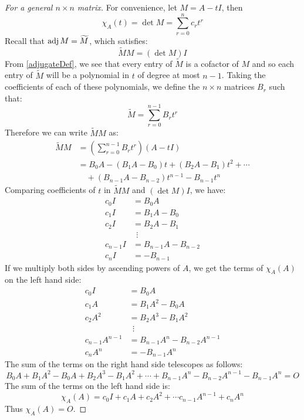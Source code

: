 \documentclass[../main.tex]{subfiles}
\begin{document}
\begin{proof}[For a general $n \times n$ matrix]
  \nonexaminable
  For convenience, let $M = A - tI$, then
  \[
    \chi_A(t) = \det M = \sum_{r = 0}^{n} c_r t^{r}
  \]
  Recall that $\operatorname{adj} M =\widetilde{M}$, which satisfies:
  \[
    \widetilde{M}M = (\det M)I
  \]
  From \cref{adjugateDef}, we see that every entry of $\widetilde{M}$ is a cofactor of $M$ and so each entry of $\widetilde{M}$ will be a polynomial in $t$ of degree at most $n - 1$.
  Taking the coefficients of each of these polynomials, we define the $n \times n$ matrices $B_r$ such that:
  \[
    \widetilde{M} = \sum_{r = 0}^{n - 1}  B_r t^{r}
  \]
  Therefore we can write $\widetilde{M} M$ as:
  \begin{align*}
    \widetilde{M} M &= \left(\sum_{r = 0}^{n - 1} B_r t^{r}\right)(A - tI) \\
                    &= B_0 A - (B_1 A - B_0)t + (B_2 A - B_1)t^2 + \cdots \\
                    &\quad + (B_{n - 1}A - B_{n- 2})t^{n - 1} - B_{n - 1}t^{n}
  \end{align*}
  Comparing coefficients of $t$ in $\widetilde{M} M$ and $(\det M)I$, we have:
  \begin{align*}
    c_0 I &= B_0 A \\
    c_1 I &= B_1 A - B_0 \\
    c_2 I &= B_2 A - B_1 \\
          &\ \ \vdots \\
    c_{n-1}I &= B_{n - 1}A - B_{n - 2} \\
    c_n I &= -B_{n - 1}
  \end{align*}
  If we multiply both sides by ascending powers of $A$, we get the terms of $\chi_A(A)$ on the left hand side:
  \begin{align*}
    c_0 I &= B_0 A \\
    c_1 A &= B_1 A^2 - B_0A \\
    c_2 A^2 &= B_2 A^3 - B_1A^2 \\
          &\ \ \vdots \\
    c_{n-1}A^{n - 1} &= B_{n - 1}A^{n} - B_{n - 2}A^{n - 1} \\
    c_n A^{n} &= -B_{n - 1}A^{n}
  \end{align*}
  The sum of the terms on the right hand side telescopes as follows:
  \[
    B_0A+B_1A^2 - B_0A + B_2 A^3 - B_1A^2 + \cdots + B_{n-1}A^{n} - B_{n-2}A^{n-1} -B_{n-1}A^{n} =O
  \]
  The sum of the terms on the left hand side is:
  \[
    \chi_A(A) = c_0 I + c_1 A + c_2 A^2 + \cdots c_{n - 1}A^{n - 1} + c_n A^{n}
  \]
  Thus $\chi_A(A) = O$.
\end{proof}
\end{document}
